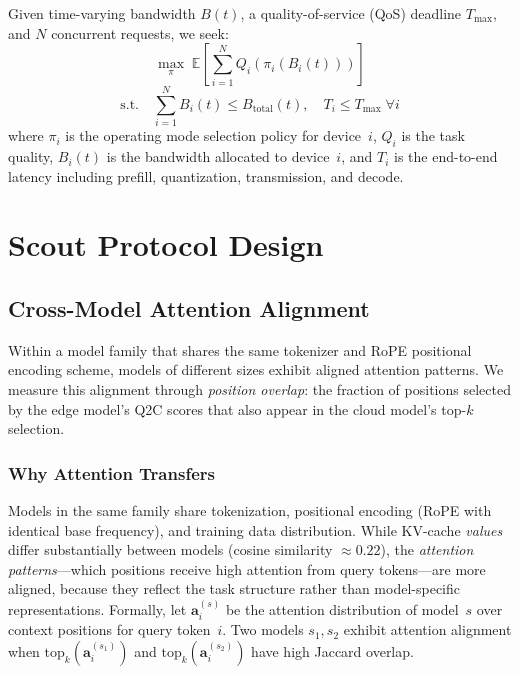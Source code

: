 \documentclass[conference]{IEEEtran}
\newcommand{\QtoC}{\textsc{Q2C}\xspace}
\begin{document}
Given time-varying bandwidth $B(t)$, a quality-of-service (QoS) deadline $T_{\max}$, and $N$ concurrent requests, we seek:
\begin{equation}
    \max_{\pi} \; \mathbb{E}\left[\sum_{i=1}^{N} Q_i(\pi_i(B_i(t)))\right]
    \label{eq:objective}
\end{equation}
\vspace{-2mm}
\begin{equation}
    \text{s.t.} \quad \sum_{i=1}^{N} B_i(t) \leq B_{\text{total}}(t), \quad T_i \leq T_{\max} \; \forall i
\end{equation}
where $\pi_i$ is the operating mode selection policy for device~$i$, $Q_i$ is the task quality, $B_i(t)$ is the bandwidth allocated to device~$i$, and $T_i$ is the end-to-end latency including prefill, quantization, transmission, and decode.


\section{Scout Protocol Design}
\label{sec:scout}

\subsection{Cross-Model Attention Alignment}

Within a model family that shares the same tokenizer and RoPE positional encoding scheme, models of different sizes exhibit aligned attention patterns.
We measure this alignment through \emph{position overlap}: the fraction of positions selected by the edge model's \QtoC scores that also appear in the cloud model's top-$k$ selection.

\subsubsection{Why Attention Transfers}

Models in the same family share tokenization, positional encoding (RoPE with identical base frequency), and training data distribution.
While KV-cache \emph{values} differ substantially between models (cosine similarity $\approx 0.22$), the \emph{attention patterns}---which positions receive high attention from query tokens---are more aligned, because they reflect the task structure rather than model-specific representations.
Formally, let $\mathbf{a}_i^{(s)}$ be the attention distribution of model~$s$ over context positions for query token~$i$.
Two models $s_1, s_2$ exhibit attention alignment when $\text{top}_k(\mathbf{a}_i^{(s_1)})$ and $\text{top}_k(\mathbf{a}_i^{(s_2)})$ have high Jaccard overlap.
\end{document}
